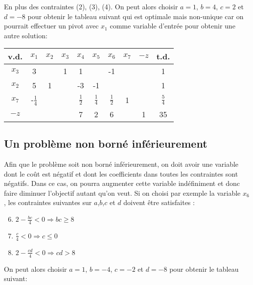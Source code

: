 En plus des contraintes (2), (3), (4). On peut alors choisir $a = 1$, $b=4$, $c=2$ et $d=-8$ pour obtenir le tableau suivant qui est optimale mais non-unique car on pourrait effectuer un pivot avec $x_1$ comme variable d’entrée pour obtenir une autre solution:
	
\begin{center}
	\renewcommand{\arraystretch}{1.5}
	\begin{tabular}{|c|cccccccc|c|}
		\hline
		v.d.  &     $x_1$      & $x_2$ & $x_3$ &     $x_4$     &     $x_5$     &     $x_6$     & $x_7$ & $-z$ &     t.d.      \\ \hline
		$x_3$ &       3        &       &   1   &       1       &               &      -1       &       &      &       1       \\
		$x_2$ &       5        &   1   &       &      -3       &      -1       &               &       &      &       1       \\
		$x_7$ & -$\frac{1}{4}$ &       &       & $\frac{1}{2}$ & $\frac{1}{4}$ & $\frac{1}{2}$ &   1   &      & $\frac{5}{4}$ \\ \hline
		$-z$  &                &       &       &       7       &       2       &       6       &       &  1   &      35       \\ \hline
	\end{tabular}
\end{center}

\subsection{Un problème non borné inférieurement}
Afin que le problème soit non borné inférieurement, on doit avoir une variable dont le coût est négatif et dont les coefficients dans toutes les contraintes sont négatifs. Dans ce cas, on pourra augmenter cette variable indéfiniment et donc faire diminuer l’objectif autant qu’on veut. Si on choisi par exemple la variable $x_6$, les contraintes suivantes sur $a$,$b$,$c$ et $d$ doivent être satisfaites :
\begin{enumerate}[label=(\arabic*),itemsep=1pt]
	\setcounter{enumi}{5}
	\item $2 - \frac{bc}{4} < 0 \Rightarrow bc \geq 8$
	\item $\frac{c}{4} < 0 \Rightarrow  c \leq 0$
	\item $2 - \frac{cd}{4} < 0 \Rightarrow cd > 8$
\end{enumerate}

On peut alors choisir $a = 1$, $b = -4$, $c = -2$ et $d = -8$ pour obtenir le tableau suivant:
	
